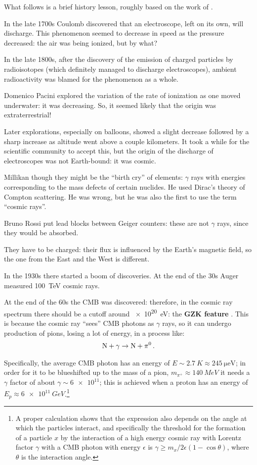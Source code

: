 \documentclass[main.tex]{subfiles}
\begin{document}
What follows is a brief history lesson, roughly based on the work of \textcite[]{deangelisAtmosphericIonizationCosmic2014}.

In the late 1700s Coulomb discovered that an electroscope, left on its own, will discharge. 
This phenomenon seemed to decrease in speed as the pressure decreased: the air was being ionized, but by what?

In the late 1800s, after the discovery of the emission of charged particles by radioisotopes (which definitely managed to discharge electroscopes), ambient radioactivity was blamed for the phenomenon as a whole. 

Domenico Pacini explored the variation of the rate of ionization as one moved underwater: it was decreasing. 
So, it seemed likely that the origin was extraterrestrial! 

Later explorations, especially on balloons, showed a slight decrease followed by a sharp increase as altitude went above a couple kilometers.
It took a while for the scientific community to accept this, but the origin of the discharge of electroscopes was not Earth-bound: it was cosmic.
 
Millikan though they might be the ``birth cry'' of elements: \(\gamma \) rays with energies
corresponding to the mass defects of certain nuclides. 
He used Dirac's theory of Compton scattering. 
He was wrong, but he was also the first to use the term ``cosmic rays''.

Bruno Rossi put lead blocks between Geiger counters: these are not \(\gamma \) rays, since
they would be absorbed. 

They have to be charged: their flux is influenced by the Earth's magnetic field, so 
the one from the East and the West is different. 

In the 1930s there started a boom of discoveries. 
At the end of the 30s Auger measured \SI{100}{TeV} cosmic rays. 

At the end of the 60s the CMB was discovered: 
therefore, in the cosmic ray spectrum there should be a cutoff around \SI{e20}{eV}: the \textbf{GZK feature} \cite[sec.\ 5.1]{aloisioSelectedTopicsCosmic2018}. 
This is because the cosmic ray ``sees'' CMB photons as \(\gamma \) rays, so  
it can undergo production of pions, losing a lot of energy, in a process like: 
%
\begin{align}
\ce{N} + \gamma \to \ce{N} + \pi^{0}
\,.
\end{align}

Specifically, the average CMB photon has an energy of \(E \sim \SI{2.7}{K} \approx \SI{245}{\micro \eV}\); in order for it to be blueshifted up to the mass of a pion, \(m_{\pi^{+}} \approx \SI{140}{MeV}\) it needs a \(\gamma \) factor of about \(\gamma \sim \num{6e11}\); this is achieved when a proton has an energy of \(E_p \approx \SI{6e11}{GeV}\).\footnote{A proper calculation shows that the expression also depends on the angle at which the particles interact, and specifically the threshold for the formation of a particle \(x\) by the interaction of a high energy cosmic ray with Lorentz factor \(\gamma \) with a CMB photon with energy \(\epsilon \) is \(\gamma \geq m_x / 2 \epsilon (1 - \cos \theta )\), where \(\theta \) is the interaction angle.}
\end{document}
